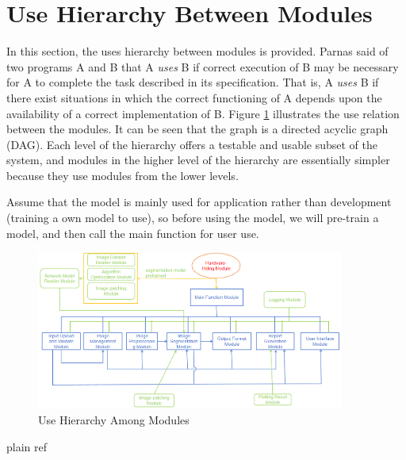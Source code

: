 \documentclass[12pt, titlepage]{article}
\begin{document}
\section{Use Hierarchy Between Modules} \label{SecUse}

In this section, the uses hierarchy between modules is provided. Parnas \cite{parnas1979designing} said of two programs A and B that A {\em uses} B if correct execution of B may be necessary for A to complete the task described in its specification. That is, A {\em uses} B if there exist situations in which the correct functioning of A depends upon the availability of a correct implementation of B.  Figure \ref{Fig1} illustrates the use relation between the modules. It can be seen that the graph is a directed acyclic graph (DAG). Each level of the hierarchy offers a testable and usable subset of the system, and modules in the higher level of the hierarchy are essentially simpler because they use modules from the lower levels.

Assume that the model is mainly used for application rather than development (training a own model to use), so before using the model, we will pre-train a model, and then call the main function for user use.

\begin{figure}[H]
\centering
\includegraphics[width=0.9\textwidth]{1.png}
\caption{Use Hierarchy Among Modules}
\label{Fig1}
\end{figure}

\newpage
 {plain}
 {ref}

\newpage{}
\end{document}
